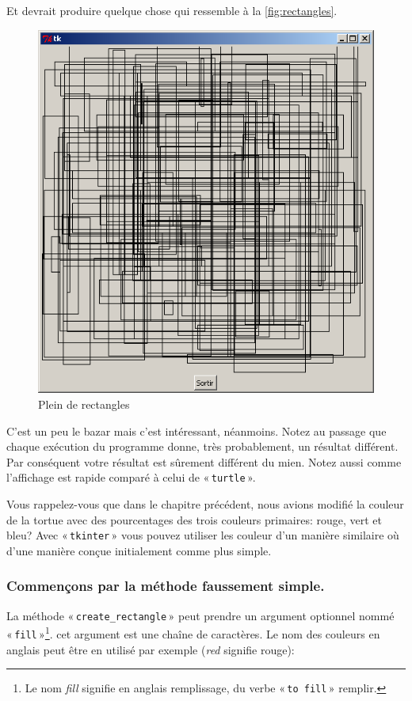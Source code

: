 Et devrait produire quelque chose qui ressemble à la \autoref{fig:rectangles}.
\begin{figure}[h!]
\centering
\includegraphics[scale=0.4]{images/rectangles}
\caption{Plein de rectangles}\label{fig:rectangles}
\end{figure}

C'est un peu le bazar mais c'est intéressant, néanmoins.
Notez au passage que chaque exécution du programme donne, très probablement, un résultat différent. Par conséquent votre résultat est sûrement différent du mien. Notez aussi comme l'affichage est rapide comparé à celui de « \texttt{turtle} ».

Vous rappelez-vous que dans le chapitre précédent, nous avions modifié la couleur de la tortue avec des pourcentages des trois couleurs primaires: rouge, vert et bleu? Avec « \texttt{tkinter} » vous pouvez utiliser les couleur d'un manière similaire où d'une manière conçue initialement comme plus simple.

\subsubsection*{Commençons par la méthode faussement simple.}
La méthode « \texttt{create\_rectangle} » peut prendre un argument optionnel nommé « \texttt{fill} »\footnote{Le nom \emph{fill} signifie en anglais remplissage, du verbe « \texttt{to fill} » remplir.}. cet argument est une chaîne de caractères. Le nom des couleurs en anglais peut être en utilisé par exemple (\emph{red} signifie rouge):

